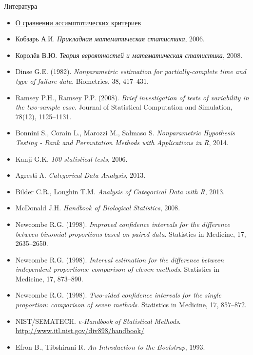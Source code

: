 \documentclass[11pt,pdf,utf8,hyperref={unicode},aspectratio=169]{beamer}
\begin{document}
    \begin{frame}[allowframebreaks]{Литература}
        \begin{itemize}
            \item \href{https://stats.idre.ucla.edu/other/mult-pkg/faq/general/faqhow-are-the-likelihood-ratio-wald-and-lagrange-multiplier-score-tests-different-andor-similar/}{О сравнении ассимптотических критериев}
            \item Кобзарь А.И. \textit{Прикладная математическая статистика}, 2006.
            \item Королёв В.Ю. \textit{Теория вероятностей и математическая статистика}, 2008.

            \bigskip


\item Dinse G.E. (1982). \textit{Nonparametric estimation for partially-complete time and	type of failure data}. Biometrics, 38, 417–431.
\item Ramsey P.H., Ramsey P.P. (2008). \textit{Brief investigation of tests of variability in the two-sample case}. Journal of Statistical Computation and Simulation, 78(12), 1125--1131.
\item Bonnini S., Corain L., Marozzi M., Salmaso S. \textit{Nonparametric Hypothesis Testing - Rank and Permutation Methods with Applications in R}, 2014.
\item  Kanji G.K. \textit{100 statistical tests}, 2006.
\item Agresti A. \textit{Categorical Data Analysis}, 2013.
\item Bilder C.R., Loughin T.M. \textit{Analysis of Categorical Data with R}, 2013.
\item McDonald J.H. \textit{Handbook of Biological Statistics}, 2008.
\item Newcombe R.G. (1998). \textit{Improved confidence intervals for the difference between binomial proportions based on paired data}. Statistics in Medicine, 17, 2635–2650.
\item Newcombe R.G. (1998). \textit{Interval estimation for the difference between independent proportions: comparison of eleven methods}. Statistics in Medicine, 17, 873–890.
\item Newcombe R.G. (1998). \textit{Two-sided confidence intervals for the single proportion: comparison of seven methods}. Statistics in Medicine, 17, 857–872.
\item  NIST/SEMATECH. \textit{e-Handbook of Statistical Methods}. \url{http://www.itl.nist.gov/div898/handbook/}
\item  Efron B., Tibshirani R. \textit{An Introduction to the Bootstrap}, 1993.

\end{itemize}
\end{frame}
\end{document}
